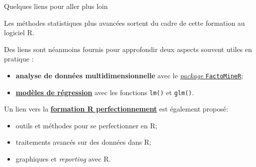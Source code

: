 \documentclass[12pt,ignorenonframetext,]{beamer}
\providecommand{\tightlist}{%
  \setlength{\itemsep}{0pt}\setlength{\parskip}{0pt}}
\newcommand{\link}[1]{\textcolor{redInsee}{\underline{#1}}}
\begin{document}
\begin{frame}[fragile]{Quelques liens pour aller plus loin}

Les méthodes statistiques plus avancées sortent du cadre de cette
formation au logiciel R.

\pause Des liens sont néanmoins fournis pour approfondir deux aspects
souvent utiles en pratique :

\begin{itemize}
\tightlist
\item
  \textbf{analyse de données multidimensionnelle} avec le
  \href{https://CRAN.R-project.org/package=FactoMineR}{\link{\textit{package} \texttt{FactoMineR}}};
\item
  \href{http://teaching.slmc.fr/mqs2/index.html}{\link{\textbf{modèles de régression}}}
  avec les fonctions \texttt{lm()} et \texttt{glm()}.
\end{itemize}

\bigskip \pause Un lien vers la
\href{http://teaching.slmc.fr/perf/index.html}{\textbf{\link{formation R perfectionnement}}}
est également proposé:

\begin{itemize}
\tightlist
\item
  outils et méthodes pour se perfectionner en R;
\item
  traitements avancés sur des données dans R;
\item
  graphiques et \emph{reporting} avec R.
\end{itemize}

\end{frame}
\end{document}
